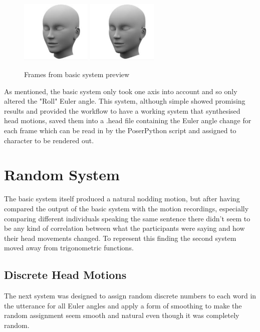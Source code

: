 \documentclass[bsc,frontabs,twoside,singlespacing,parskip]{infthesis}
\begin{document}
\begin{figure}
	\includegraphics[width=0.3\textwidth]{head.png}
	\includegraphics[width=0.3\textwidth]{head.png}
	\caption{Frames from basic system preview}
\end{figure}

As mentioned, the basic system only took one axis into account and so only altered the "Roll" Euler angle. This system, although simple showed promising results and provided the workflow to have a working system that synthesised head motions, saved them into a .head file containing the Euler angle change for each frame which can be read in by the PoserPython script and assigned to character to be rendered out.

\section{Random System}

The basic system itself produced a natural nodding motion, but after having compared the output of the basic system with the motion recordings, especially comparing different individuals speaking the same sentence there didn't seem to be any kind of correlation between what the participants were saying and how their head movements changed. To represent this finding the second system moved away from trigonometric functions.

\subsection{Discrete Head Motions}

The next system was designed to assign random discrete numbers to each word in the utterance for all Euler angles and apply a form of smoothing to make the random assignment seem smooth and natural even though it was completely random. 
\end{document}
